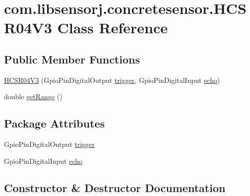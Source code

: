 \hypertarget{classcom_1_1libsensorj_1_1concretesensor_1_1HCSR04V3}{}\section{com.\+libsensorj.\+concretesensor.\+H\+C\+S\+R04\+V3 Class Reference}
\label{classcom_1_1libsensorj_1_1concretesensor_1_1HCSR04V3}
\subsection*{Public Member Functions}
\begin{DoxyCompactItemize}
\item 
\hyperlink{classcom_1_1libsensorj_1_1concretesensor_1_1HCSR04V3_aee1d36751b6c99c5f7174b251fcc8a4c}{H\+C\+S\+R04\+V3} (Gpio\+Pin\+Digital\+Output \hyperlink{classcom_1_1libsensorj_1_1concretesensor_1_1HCSR04V3_a19762eb3b140e33fde8b7e2d936a43dc}{trigger}, Gpio\+Pin\+Digital\+Input \hyperlink{classcom_1_1libsensorj_1_1concretesensor_1_1HCSR04V3_af9a0b50a27f87a546ac58b58bb31d904}{echo})
\item 
double \hyperlink{classcom_1_1libsensorj_1_1concretesensor_1_1HCSR04V3_acf38feee3623adedf5708d11e5f94158}{get\+Range} ()
\end{DoxyCompactItemize}
\subsection*{Package Attributes}
\begin{DoxyCompactItemize}
\item 
Gpio\+Pin\+Digital\+Output \hyperlink{classcom_1_1libsensorj_1_1concretesensor_1_1HCSR04V3_a19762eb3b140e33fde8b7e2d936a43dc}{trigger}
\item 
Gpio\+Pin\+Digital\+Input \hyperlink{classcom_1_1libsensorj_1_1concretesensor_1_1HCSR04V3_af9a0b50a27f87a546ac58b58bb31d904}{echo}
\end{DoxyCompactItemize}


\subsection{Constructor \& Destructor Documentation}
\hypertarget{classcom_1_1libsensorj_1_1concretesensor_1_1HCSR04V3_aee1d36751b6c99c5f7174b251fcc8a4c}{}
